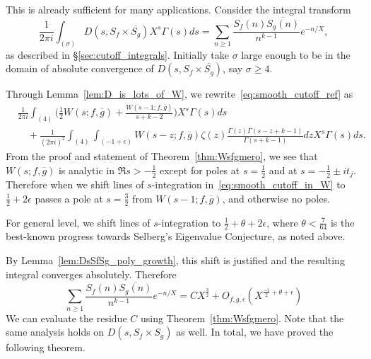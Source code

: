 This is already sufficient for many applications.
Consider the integral transform
\begin{equation}\label{eq:smooth_cutoff_ref}
  \frac{1}{2\pi i} \int_{(\sigma)} D(s, S_f \times \overline{S_g}) X^s \Gamma(s) ds =
  \sum_{n \geq 1} \frac{S_f(n) \overline{S_g(n)}}{n^{k-1}} e^{-n/X},
\end{equation}
as described in \S\ref{sec:cutoff_integrals}.
Initially take $\sigma$ large enough to be in the domain of absolute convergence of $D(s,
S_f \times \overline{S_g})$, say $\sigma \geq 4$.


Through Lemma~\ref{lem:D_is_lots_of_W}, we rewrite~\eqref{eq:smooth_cutoff_ref} as
\begin{equation}\label{eq:smooth_cutoff_in_W}
  \begin{split}
    &\frac{1}{2\pi i} \int_{(4)} \bigg(\frac{1}{2} W(s; f, \overline{g}) + \frac{W(s-1; f,
\overline{g})}{s + k - 2} \bigg) X^s \Gamma(s) ds \\
    &\quad+ \frac{1}{(2\pi i)^2} \int_{(4)} \int_{(-1 + \epsilon)} W(s-z; f, \overline{g})
\zeta(z) \frac{\Gamma(z) \Gamma(s - z + k - 1)}{\Gamma(s + k - 1)}dz X^s \Gamma(s) ds.
  \end{split}
\end{equation}
From the proof and statement of Theorem~\ref{thm:Wsfgmero}, we see that $W(s; f,
\overline{g})$ is analytic in $\Re s > -\frac{1}{2}$ except for poles at $s = \frac{1}{2}$
and at $s = -\frac{1}{2} \pm it_j$.
Therefore when we shift lines of $s$-integration in~\eqref{eq:smooth_cutoff_in_W} to
$\frac{1}{2} + 2\epsilon$ passes a pole at $s = \frac{3}{2}$ from $W(s-1; f,
\overline{g})$, and otherwise no poles.


\begin{remark}
  For general level, we shift lines of $s$-integration to $\frac{1}{2} + \theta +
  2\epsilon$, where $\theta < \frac{7}{64}$ is the best-known progress towards Selberg's
  Eigenvalue Conjecture, as noted above.
\end{remark}


By Lemma~\ref{lem:DsSfSg_poly_growth}, this shift is justified and the resulting integral
converges absolutely.
Therefore
\begin{equation}
  \sum_{n \geq 1} \frac{S_f(n)\overline{S_g(n)}}{n^{k-1}} e^{-n/X} = C X^{\frac{3}{2}} +
  O_{f,g,\epsilon}(X^{\frac{-1}{2}+\theta+\epsilon})
\end{equation}
We can evaluate the residue $C$ using Theorem~\ref{thm:Wsfgmero}.
Note that the same analysis holds on $D(s, S_f \times S_g)$ as well.
In total, we have proved the following theorem.



